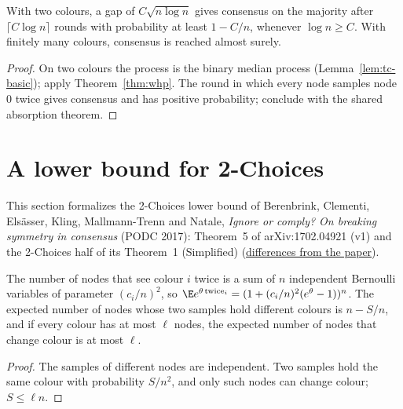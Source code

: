\begin{theorem}\label{thm:tc-two}
\leanok{}
With two colours, a gap of $C\sqrt{n\log n}$ gives consensus on the majority after
$\lceil C\log n\rceil$ rounds with probability at least $1-C/n$, whenever $\log n\ge C$. With
finitely many colours, consensus is reached almost surely.
\end{theorem}
\begin{proof}\leanok
On two colours the process is the binary median process (Lemma~\ref{lem:tc-basic}); apply
Theorem~\ref{thm:whp}. The round in which every node samples node $0$ twice gives consensus and
has positive probability; conclude with the shared absorption theorem.
\end{proof}

\section{A lower bound for 2-Choices}\label{sec:bcekmn-lower}
This section formalizes the 2-Choices lower bound of Berenbrink, Clementi, Elsässer, Kling,
Mallmann-Trenn and Natale, \emph{Ignore or comply? On breaking symmetry in consensus} (PODC 2017):
Theorem~5 of arXiv:1702.04921 (v1) and the 2-Choices half of its Theorem~1
(Simplified)
(\href{https://github.com/formal-dynamics/leanamics/blob/main/median/FORMALIZATION_DIFFERENCES.md#the-lower-bound-for-2-choices-twochoiceslower-roadmap-maj-6-a}{differences
from the paper}).

\begin{lemma}\label{lem:tc-few-changes}
\leanok{}
The number of nodes that see colour $i$ twice is a sum of $n$ independent Bernoulli variables of
parameter $(c_i/n)^2$, so $\E e^{\theta\,\mathrm{twice}_i}=(1+(c_i/n)^2(e^\theta-1))^n$. The expected
number of nodes whose two samples hold different colours is $n-S/n$, and if every colour has at
most $\ell$ nodes, the expected number of nodes that change colour is at most $\ell$.
\end{lemma}
\begin{proof}\leanok
The samples of different nodes are independent. Two samples hold the same colour with probability
$S/n^2$, and only such nodes can change colour; $S\le\ell n$.
\end{proof}

